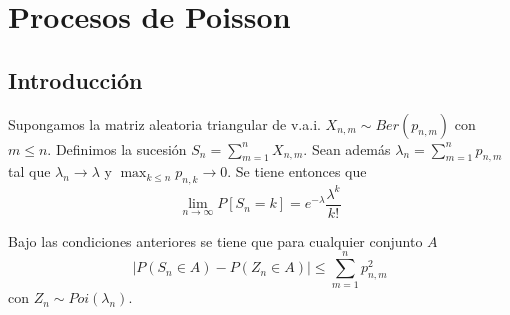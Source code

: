 \documentclass[PREyA.tex]{subfiles}
\providecommand{\abs}[1]{\left\lvert#1\right\rvert}
\begin{document}
\chapter{Procesos de Poisson}
\section{Introducción}
\begin{theorem}
Supongamos la matriz aleatoria triangular de v.a.i. $X_{n,m} \sim Ber(p_{n,m})$ con $m\leq n$. Definimos la sucesión $S_n = \sum_{m=1}^n X_{n,m}$. Sean además $\lambda_n = \sum_{m=1}^n p_{n,m}$ tal que $\lambda_n \to \lambda$ y $\max_{k\leq n}p_{n,k}\to0$. Se tiene entonces que
$$
\lim_{n\to \infty} P[S_n = k] = e^{-\lambda}\frac{\lambda^k}{k!}
$$
\end{theorem}
\begin{coro}
Bajo las condiciones anteriores se tiene que para cualquier conjunto $A$
$$
\abs{P(S_n\in A)-P(Z_n\in A)} \leq \sum_{m=1}^n p_{n,m}^2
$$
con $Z_n \sim Poi(\lambda_n)$.
\end{coro}
\end{document}
